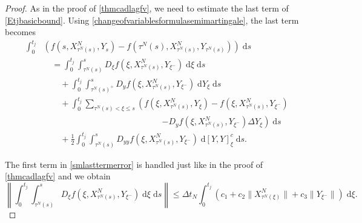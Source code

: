 \documentclass[reqno,12pt]{amsart}
\theoremstyle{plain} %
\theoremstyle{definition} %
\begin{document}
\begin{proof}
    As in the proof of \eqref{thmcadlagfv}, we need to estimate the last term of \eqref{Etjbasicbound}. Using \eqref{changeofvariablesformulasemimartingale}, the last term becomes
    \begin{equation}
        \label{smlasttermerror}
        \begin{aligned}
            \int_0^{t_j} & \left( f(s, X_{\tau^N(s)}^N, Y_s) - f(\tau^N(s), X_{\tau^N(s)}^N, Y_{\tau^N(s)}) \right)\;\mathrm{d}s \\
            & \quad = \int_0^{t_j} \int_{\tau^N(s)}^s D_\xi f(\xi, X_{\tau^N(s)}^N, Y_{\xi^-})\;\mathrm{d}\xi \;\mathrm{d}s \\
            & \qquad + \int_0^{t_j} \int_{\tau^N(s)^+}^s D_y f(\xi, X_{\tau^N(s)}^N, Y_{\xi^-}) \;\mathrm{d}Y_\xi \;\mathrm{d}s \\
            & \qquad + \int_0^{t_j} \sum_{\tau^N(s) < \xi \leq s} \left(f(\xi, X_{\tau^N(s)}^N, Y_\xi) - f(\xi, X_{\tau^N(s)}^N, Y_{\xi^{-}}) \right. \\
            & \qquad \qquad \qquad \qquad \qquad \qquad \qquad \left. - D_y f(\xi, X_{\tau^N(s)}^N, Y_{\xi^-})\Delta Y_\xi\right) \;\mathrm{d}s \\ 
            & \qquad + \frac{1}{2} \int_0^{t_j} \int_{\tau^N(s)}^s D_{yy}f(\xi, X_{\tau^N(s)}^N, Y_{\xi^-})\;\mathrm{d}[Y, Y]_\xi^c\;\mathrm{d}s.
        \end{aligned}
    \end{equation}
    
    The first term in \eqref{smlasttermerror} is handled just like in the proof of \cref{thmcadlagfv} and we obtain
    \[
        \left\|\int_0^{t_j} \int_{\tau^N(s)}^s D_\xi f(\xi, X_{\tau^N(s)}^N, Y_{\xi^-})\;\mathrm{d}\xi\;\mathrm{d}s\right\| \leq \Delta t_N\int_0^{t_j} \left(c_1 + c_2 \|X_{\tau^N(\xi)}^N\| + c_3\|Y_{\xi^-}\|\right)\;\mathrm{d}\xi.
    \]


\end{proof}
\end{document}
